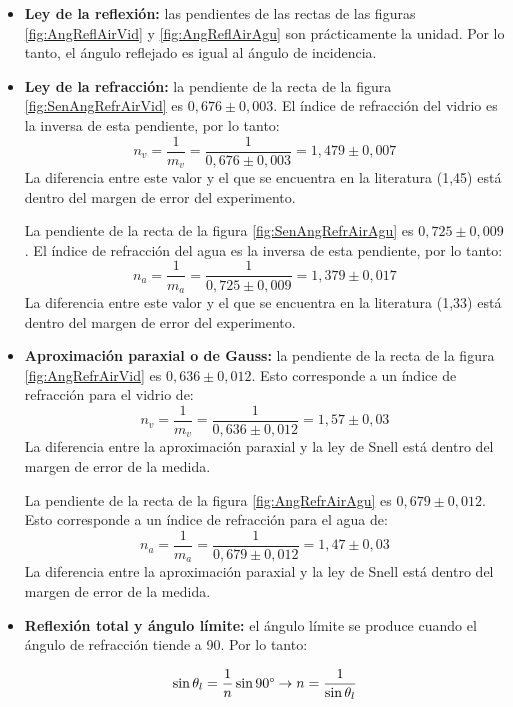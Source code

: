 \documentclass[a4paper,twocolumn]{article}
\begin{document}
    \begin{itemize}

        \item \textbf{Ley de la reflexión:} las pendientes de las rectas de las figuras \ref{fig:AngReflAirVid} y \ref{fig:AngReflAirAgu} son prácticamente la unidad. Por lo tanto, el ángulo reflejado es igual al ángulo de incidencia.
        
        \item \textbf{Ley de la refracción:} la pendiente de la recta de la figura \ref{fig:SenAngRefrAirVid} es $0,676 \pm 0,003$. El índice de refracción del vidrio es la inversa de esta pendiente, por lo tanto:
        $$ n_v = \frac{1}{m_v} = \frac{1}{0,676 \pm 0,003} = 1,479 \pm 0,007 $$        
        La diferencia entre este valor y el que se encuentra en la literatura (1,45) está dentro del margen de error del experimento.

        La pendiente de la recta de la figura \ref{fig:SenAngRefrAirAgu} es $0,725 \pm 0,009$. El índice de refracción del agua es la inversa de esta pendiente, por lo tanto:
        $$ n_a = \frac{1}{m_a} = \frac{1}{0,725 \pm 0,009} = 1,379 \pm 0,017 $$
        La diferencia entre este valor y el que se encuentra en la literatura (1,33) está dentro del margen de error del experimento.

        \item \textbf{Aproximación paraxial o de Gauss:} la pendiente de la recta de la figura \ref{fig:AngRefrAirVid} es $0,636 \pm 0,012$. Esto corresponde a un índice de refracción para el vidrio de:        
        $$ n_v = \frac{1}{m_v} = \frac{1}{0,636 \pm 0,012} = 1,57 \pm 0,03 $$
        La diferencia entre la aproximación paraxial y la ley de Snell está dentro del margen de error de la medida.

        La pendiente de la recta de la figura \ref{fig:AngRefrAirAgu} es $0,679 \pm 0,012$. Esto corresponde a un índice de refracción para el agua de:        
        $$ n_a = \frac{1}{m_a} = \frac{1}{0,679 \pm 0,012} = 1,47 \pm 0,03 $$
        La diferencia entre la aproximación paraxial y la ley de Snell está dentro del margen de error de la medida.

        \item \textbf{Reflexión total y ángulo límite:} el ángulo límite se produce cuando el ángulo de refracción tiende a 90\textdegree. Por lo tanto:

        $$ \sin \theta_l = \frac{1}{n} \sin 90 \text{\textdegree} \rightarrow n = \frac{1}{\sin \theta_l} $$
        

\end{itemize}
\end{document}
